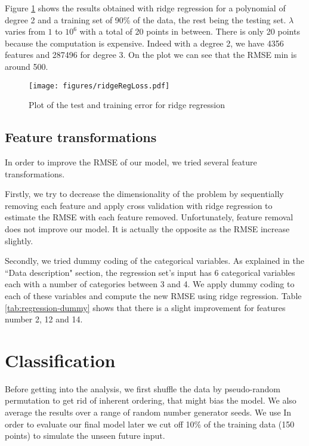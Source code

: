 \documentclass{article} %
\begin{document}
Figure \ref{fig:ridgeRegError} shows the results obtained with ridge regression for a polynomial of degree 2 and a training set of 90\% of the data, the rest being the testing set. $\lambda$ varies from $1$ to $10^{6}$ with a total of 20 points in between. 
There is only 20 points because the computation is expensive. Indeed with a degree 2, we have 4356 features and 287496 for degree 3.
On the plot we can see that the RMSE min is around 500.

\begin{figure}[!t]
	\center
	\texttt{[image: figures/ridgeRegLoss.pdf]}
	\caption{Plot of the test and training error for ridge regression}
	\label{fig:ridgeRegError}
\end{figure}


\subsection{Feature transformations}
In order to improve the RMSE of our model, we tried several feature transformations.

Firstly, we try to decrease the dimensionality of the problem by sequentially removing each feature and apply cross validation with ridge regression to estimate the RMSE with each feature removed.
Unfortunately, feature removal does not improve our model. It is actually the opposite as the RMSE increase slightly.

Secondly, we tried dummy coding of the categorical variables.
As explained in the ``Data description" section, the regression set's input has 6 categorical variables each with a number of categories between 3 and 4.
We apply dummy coding to each of these variables and compute the new RMSE using ridge regression.
Table \ref{tab:regression-dummy} shows that there is a slight improvement for features number 2, 12 and 14. 

\section{Classification}

Before getting into the analysis, we first shuffle the data by pseudo-random permutation to get rid of inherent ordering, that might bias the model. We also average the results over a range of random number generator seeds. We use In order to evaluate our final model later we cut off 10\% of the training data (150 points) to simulate the unseen future input.
\end{document}
